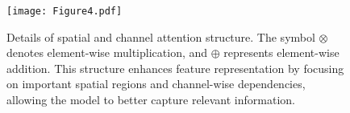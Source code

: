 

\begin{figure}[htbp]
\setlength{\abovecaptionskip}{2pt}
\setlength{\belowcaptionskip}{0pt}
\centering
\texttt{[image: Figure4.pdf]}
\caption{Details of spatial and channel attention structure. The symbol $\otimes$ denotes element-wise multiplication, and $\oplus$ represents element-wise addition.  This structure enhances feature representation by focusing on important spatial regions and channel-wise dependencies, allowing the model to better capture relevant information.}
\label{fig:fig5}
\end{figure}

% 


%